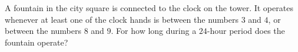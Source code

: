 A fountain in the city square is connected to the clock on the tower. It operates whenever at least one of the clock hands is between the numbers $3$ and $4$, or between the numbers $8$ and $9$. For how long during a $24$-hour period does the fountain operate?
